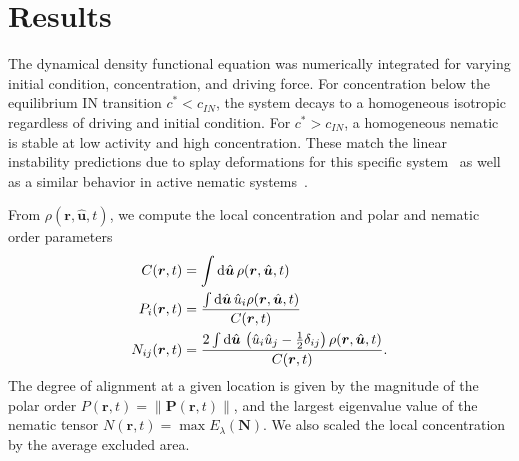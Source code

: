 \section{Results}
The dynamical density functional equation  was numerically
integrated for varying initial condition, concentration, and driving
force. For concentration below the equilibrium IN transition $c^*<c_{IN}$,
the system decays to a homogeneous isotropic regardless of driving
and initial condition.  For $c^* > c_{IN}$, a homogeneous nematic is
stable at low activity and high concentration. These match the linear
instability predictions due to splay deformations for this specific
system~\cite{baskaran_hydrodynamics_08} as well as a similar behavior in active
nematic systems~\cite{baskaran_selfregulation_12, putzig_phase_14}. 

From $\rho(\bm{r}, \hat{ \bm{u} }, t)$, we compute the local concentration and
polar and nematic order parameters 
%
\begin{align}
C(\bm{r},t) &= \int \mathop{}\!\mathrm{d}  \hat{\bm{u}} \,
  \rho( \bm{r}, \hat{\bm{u}}, t ) \\
P_i (\bm{r},t) &= \frac{\int \mathop{}\!\mathrm{d}  \hat{\bm{u}} \,
  \hat{u}_i \rho( \bm{r}, \hat{\bm{u}},t )}{C( \bm{r}, t )} \\
N_{i j} (\bm{r},t) &= \frac{2 \int \mathop{}\!\mathrm{d}  \hat{\bm{u}} \,
  \left( \hat{u}_i \hat{u}_j - \frac{1}{2} \delta_{ij} \right)
  \rho( \bm{r}, \hat{\bm{u}},t )}{C( \bm{r}, t )}.
\end{align}
%
The degree of alignment at a given location is given by the magnitude of the
polar order $ P(\bm{r},t) =  \|{ \bm{P}(\bm{r},t) } \|$, and the largest
eigenvalue value of the nematic tensor $ N(\bm{r},t) =
\max{E_{\lambda}(\bm{N})}$. We also scaled the local concentration by the
average excluded area.

